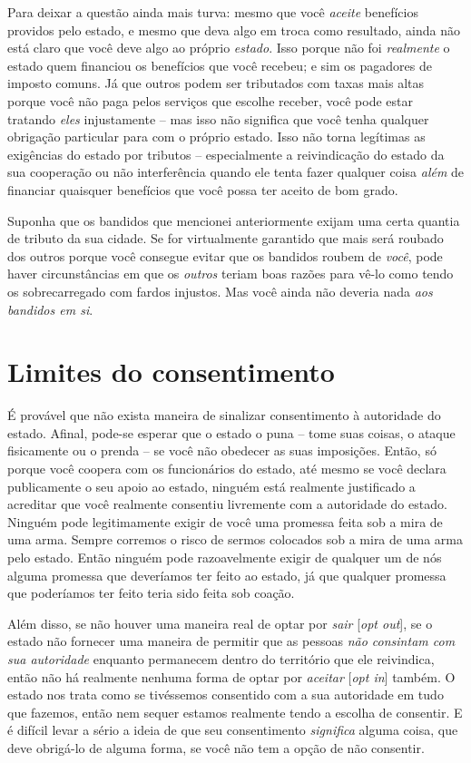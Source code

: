 Para deixar a questão ainda mais turva: mesmo que você \emph{aceite} benefícios providos pelo estado, e mesmo que deva algo em troca como resultado, ainda não está claro que você deve algo ao próprio \emph{estado}. Isso porque não foi \emph{realmente} o estado quem financiou os benefícios que você recebeu; e sim os pagadores de imposto comuns. Já que outros podem ser tributados com taxas mais altas porque você não paga pelos serviços que escolhe receber, você pode estar tratando \emph{eles} injustamente -- mas isso não significa que você tenha qualquer obrigação particular para com o próprio estado. Isso não torna legítimas as exigências do estado por tributos -- especialmente a reivindicação do estado da sua cooperação ou não interferência quando ele tenta fazer qualquer coisa \emph{além} de financiar quaisquer benefícios que você possa ter aceito de bom grado.

Suponha que os bandidos que mencionei anteriormente exijam uma certa quantia de tributo da sua cidade. Se for virtualmente garantido que mais será roubado dos outros porque você consegue evitar que os bandidos roubem de \emph{você}, pode haver circunstâncias em que os \emph{outros} teriam boas razões para vê-lo como tendo os sobrecarregado com fardos injustos. Mas você ainda não deveria nada \emph{aos bandidos em si}.

\section{Limites do consentimento}

É provável que não exista maneira de sinalizar consentimento à autoridade do estado. Afinal, pode-se esperar que o estado o puna -- tome suas coisas, o ataque fisicamente ou o prenda -- se você não obedecer as suas imposições. Então, só porque você coopera com os funcionários do estado, até mesmo se você declara publicamente o seu apoio ao estado, ninguém está realmente justificado a acreditar que você realmente consentiu livremente com a autoridade do estado. Ninguém pode legitimamente exigir de você uma promessa feita sob a mira de uma arma. Sempre corremos o risco de sermos colocados sob a mira de uma arma pelo estado. Então ninguém pode razoavelmente exigir de qualquer um de nós alguma promessa que deveríamos ter feito ao estado, já que qualquer promessa que poderíamos ter feito teria sido feita sob coação.

Além disso, se não houver uma maneira real de optar por \emph{sair} [\emph{opt out}], se o estado não fornecer uma maneira de permitir que as pessoas \emph{não consintam com sua autoridade} enquanto permanecem dentro do território que ele reivindica, então não há realmente nenhuma forma de optar por \emph{aceitar} [\emph{opt in}] também. O estado nos trata como se tivéssemos consentido com a sua autoridade em tudo que fazemos, então nem sequer estamos realmente tendo a escolha de consentir. E é difícil levar a sério a ideia de que seu consentimento \emph{significa} alguma coisa, que deve obrigá-lo de alguma forma, se você não tem a opção de não consentir.

